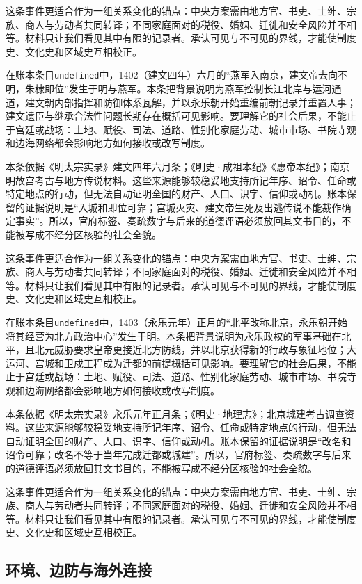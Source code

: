 这条事件更适合作为一组关系变化的锚点：中央方案需由地方官、书吏、士绅、宗族、商人与劳动者共同转译；不同家庭面对的税役、婚姻、迁徙和安全风险并不相等。材料只让我们看见其中有限的记录者。承认可见与不可见的界线，才能使制度史、文化史和区域史互相校正。

在账本条目\texttt{undefined}中，1402（建文四年）六月的“燕军入南京，建文帝去向不明，朱棣即位”发生于明与燕军。本条把背景说明为燕军控制长江北岸与运河通道，建文朝内部指挥和防御体系瓦解，并以永乐朝开始重编前朝记录并重置人事；建文遗臣与继承合法性问题长期存在概括可见影响。要理解它的社会后果，不能止于宫廷或战场：土地、赋役、司法、道路、性别化家庭劳动、城市市场、书院寺观和边海网络都会影响地方如何接收或改写制度。

本条依据《明太宗实录》建文四年六月条；《明史·成祖本纪》《惠帝本纪》；南京明故宫考古与地方传说材料。这些来源能够较稳妥地支持所记年序、诏令、任命或特定地点的行动，但无法自动证明全国的财产、人口、识字、信仰或动机。账本保留的证据说明是“入城和即位可靠；宫城火灾、建文帝生死及出逃传说不能裁作确定事实”。所以，官府标签、奏疏数字与后来的道德评语必须放回其文书目的，不能被写成不经分区核验的社会全貌。

这条事件更适合作为一组关系变化的锚点：中央方案需由地方官、书吏、士绅、宗族、商人与劳动者共同转译；不同家庭面对的税役、婚姻、迁徙和安全风险并不相等。材料只让我们看见其中有限的记录者。承认可见与不可见的界线，才能使制度史、文化史和区域史互相校正。

在账本条目\texttt{undefined}中，1403（永乐元年）正月的“北平改称北京，永乐朝开始将其经营为北方政治中心”发生于明。本条把背景说明为永乐政权的军事基础在北平，且北元威胁要求皇帝更接近北方防线，并以北京获得新的行政与象征地位；大运河、宫城和卫戍工程成为迁都的前提概括可见影响。要理解它的社会后果，不能止于宫廷或战场：土地、赋役、司法、道路、性别化家庭劳动、城市市场、书院寺观和边海网络都会影响地方如何接收或改写制度。

本条依据《明太宗实录》永乐元年正月条；《明史·地理志》；北京城建考古调查资料。这些来源能够较稳妥地支持所记年序、诏令、任命或特定地点的行动，但无法自动证明全国的财产、人口、识字、信仰或动机。账本保留的证据说明是“改名和诏令可靠；改名不等于当年完成迁都或城建”。所以，官府标签、奏疏数字与后来的道德评语必须放回其文书目的，不能被写成不经分区核验的社会全貌。

这条事件更适合作为一组关系变化的锚点：中央方案需由地方官、书吏、士绅、宗族、商人与劳动者共同转译；不同家庭面对的税役、婚姻、迁徙和安全风险并不相等。材料只让我们看见其中有限的记录者。承认可见与不可见的界线，才能使制度史、文化史和区域史互相校正。

\subsection{环境、边防与海外连接}

